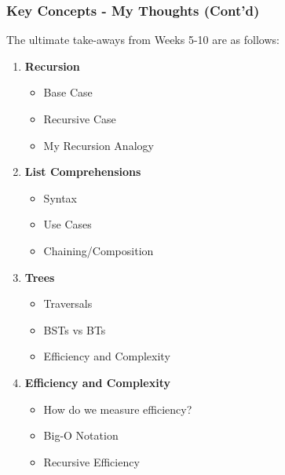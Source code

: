\documentclass[hyperref={colorlinks,citecolor=blue,linkcolor=blue,urlcolor=blue}, aspectratio=1610]{beamer}
\begin{document}
\begin{frame}
  \frametitle{Key Concepts - My Thoughts (Cont'd)} 
  The ultimate take-aways from Weeks 5-10 are as follows:
  \begin{enumerate}
    \item \textbf{Recursion}
    \begin{itemize}
      \item Base Case
      \item Recursive Case
      \item My Recursion Analogy
    \end{itemize}
    \item \textbf{List Comprehensions}
    \begin{itemize}
      \item Syntax
      \item Use Cases
      \item Chaining/Composition
    \end{itemize}
    \item \textbf{Trees}
    \begin{itemize}
      \item Traversals
      \item BSTs vs BTs
      \item Efficiency and Complexity
    \end{itemize}
    \item \textbf{Efficiency and Complexity}
    \begin{itemize}
      \item How do we measure efficiency?
      \item Big-O Notation
      \item Recursive Efficiency
    \end{itemize}
  \end{enumerate}
\end{frame}
\end{document}
